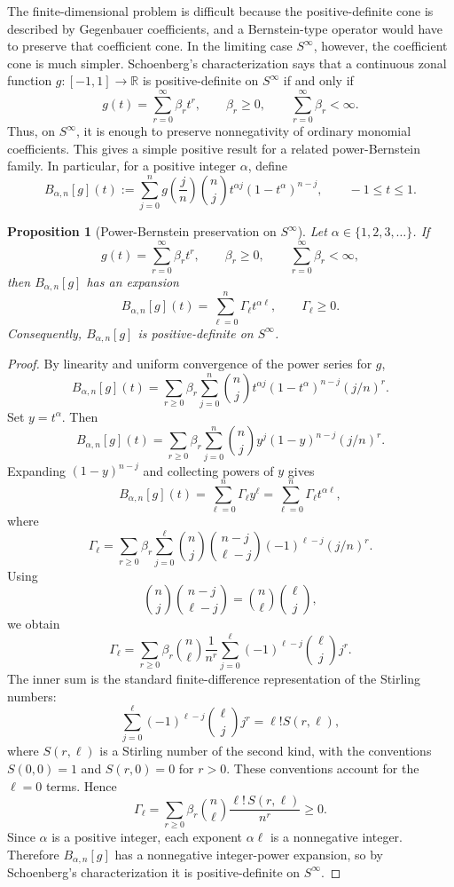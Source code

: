 \documentclass[a4paper,12pt]{amsart}
\newtheorem{proposition}[theorem]{Proposition}
\theoremstyle{definition}
\theoremstyle{remark}
\begin{document}
The finite-dimensional problem is difficult because the positive-definite cone is described by Gegenbauer coefficients, and a Bernstein-type operator would have to preserve that coefficient cone. In the limiting case $S^\infty$, however, the coefficient cone is much simpler. Schoenberg's characterization says that a continuous zonal function $g:[-1,1]\to\mathbb R$ is positive-definite on $S^\infty$ if and only if 
\[ 
g(t)=\sum_{r=0}^{\infty} \beta_r t^r, \qquad \beta_r\ge0, \qquad \sum_{r=0}^{\infty}\beta_r<\infty. 
\] 
Thus, on $S^\infty$, it is enough to preserve nonnegativity of ordinary monomial coefficients. This gives a simple positive result for a related power-Bernstein family. In particular, for a positive integer $\alpha$, define
\[
B_{\alpha,n}[g](t):= \sum_{j=0}^{n}
g \left(\frac{j}{n}\right)
\binom{n}{j}t^{\alpha j}(1-t^\alpha)^{n-j}, \qquad -1\le t\le1.
\]

\begin{proposition}[Power-Bernstein preservation on $S^\infty$]
\label{prop:power-bernstein-sinfty}
Let $\alpha \in \{1,2,3,\ldots\}$. If
\[
g(t) = \sum_{r=0}^{\infty}\beta_r t^r, 
\qquad \beta_r\ge0,
\qquad \sum_{r=0}^{\infty}\beta_r < \infty,
\]
then $B_{\alpha,n}[g]$ has an expansion
\[
B_{\alpha,n}[g](t) = \sum_{\ell=0}^{n} \Gamma_\ell t^{\alpha\ell},
\qquad \Gamma_\ell \ge 0.
\]
Consequently, $B_{\alpha,n}[g]$ is positive-definite on $S^\infty$.
\end{proposition}

\begin{proof}
By linearity and uniform convergence of the power series for $g$,
\[
B_{\alpha,n}[g](t)
=
\sum_{r\ge0} \beta_r \sum_{j=0}^{n}\binom{n}{j} t^{\alpha j}(1-t^\alpha)^{n-j}(j/n)^r.
\]
Set $y = t^\alpha$. Then
\[
B_{\alpha,n}[g](t)
=
\sum_{r \ge 0} \beta_r \sum_{j=0}^{n}\binom{n}{j} y^j(1-y)^{n-j}(j/n)^r.
\]
Expanding $(1-y)^{n-j}$ and collecting powers of $y$ gives
\[
B_{\alpha,n}[g](t) 
= \sum_{\ell=0}^{n}\Gamma_\ell y^\ell
= \sum_{\ell=0}^{n}\Gamma_\ell t^{\alpha\ell},
\]
where
\[
\Gamma_\ell
=
\sum_{r\ge 0} \beta_r \sum_{j=0}^{\ell} \binom{n}{j}\binom{n-j}{\ell-j} (-1)^{\ell-j}(j/n)^r.
\]
Using
\[
\binom{n}{j}\binom{n-j}{\ell-j}
=
\binom{n}{\ell}\binom{\ell}{j},
\]
we obtain
\[
\Gamma_\ell
=
\sum_{r\ge0}\beta_r\binom{n}{\ell}\frac{1}{n^r}
\sum_{j=0}^{\ell}(-1)^{\ell-j}\binom{\ell}{j}j^r.
\]
The inner sum is the standard finite-difference representation of the Stirling numbers:
\[
\sum_{j=0}^{\ell}(-1)^{\ell-j}\binom{\ell}{j}j^r = \ell! S(r,\ell),
\]
where $S(r,\ell)$ is a Stirling number of the second kind, with the conventions $S(0,0)=1$ and $S(r,0)=0$ for $r>0$. These conventions account for the $\ell=0$ terms. Hence
\[
\Gamma_\ell
=
\sum_{r\ge0}\beta_r\binom{n}{\ell}\frac{\ell!\,S(r,\ell)}{n^r}
\ge0.
\]
Since $\alpha$ is a positive integer, each exponent $\alpha\ell$ is a
nonnegative integer. Therefore $B_{\alpha,n}[g]$ has a nonnegative integer-power
expansion, so by Schoenberg's characterization it is positive-definite on
$S^\infty$.
\end{proof}
\end{document}
